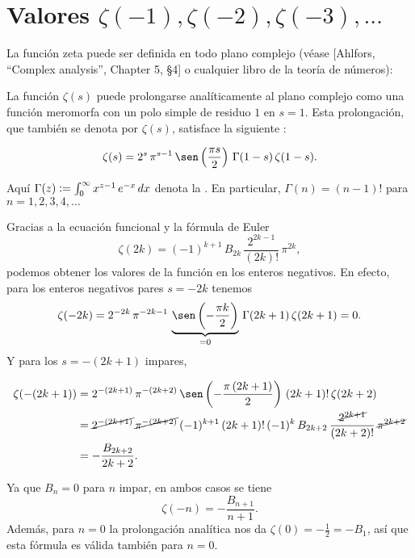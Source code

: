 \documentclass{article}
\begin{document}

\section*{Valores $\zeta (-1), \zeta (-2), \zeta (-3), \ldots$}

La función zeta puede ser definida en todo plano complejo (véase [Ahlfors, ``Complex analysis'', Chapter 5, \S 4] o cualquier libro de la teoría de números):

\begin{hecho*}
La función $\zeta (s)$ puede prolongarse analíticamente al plano complejo como una función meromorfa con un polo simple de residuo $1$ en $s = 1$. Esta prolongación, que también se denota por $\zeta (s)$, satisface la siguiente :

\begin{equation}
\label{ecuacion-funcional}
\zeta (s) = 2^s \, \pi^{s-1} \, \sen \left(\frac{\pi s}{2}\right)\,\Gamma (1-s)\,\zeta (1-s).
\end{equation}
\end{hecho*}

Aquí $\Gamma (z) \mathrel{\mathop:}= \int_0^\infty x^{z-1}\,e^{-x}\,dx$ denota la . En particular, $\Gamma (n) = (n-1)!$ para $n = 1,2,3,4,\ldots$

\vspace{1em}

Gracias a la ecuación funcional y la fórmula de Euler
$$\zeta (2k) = (-1)^{k+1} \, B_{2k}\,\frac{2^{2k-1}}{(2k)!}\,\pi^{2k},$$
podemos obtener los valores de la función en los enteros negativos. En efecto, para los enteros negativos pares $s = -2k$ tenemos
$$\zeta (-2k) = 2^{-2k} \, \pi^{-2k-1} \, \underbrace{\sen \left(-\frac{\pi k}{2}\right)}_{= 0}\,\Gamma (2k+1)\,\zeta (2k+1) = 0.$$
Y para los $s = -(2k+1)$ impares,

\begin{align*}
\zeta (-(2k+1)) & = 2^{-(2k+1)} \, \pi^{-(2k+2)} \, \sen \left(-\frac{\pi\,(2k+1)}{2}\right)\,(2k+1)!\,\zeta (2k+2) \\
 & = \cancel{2^{-(2k+1)}} \, \cancel{\pi^{-(2k+2)}}\,(-1)^{k+1}\,(2k+1)!\,(-1)^k \, B_{2k+2}\,\frac{\cancel{2^{2k+1}}}{(2k+2)!}\,\cancel{\pi^{2k+2}} \\
 & = -\frac{B_{2k+2}}{2k+2}.
\end{align*}

Ya que $B_n = 0$ para $n$ impar, en ambos casos se tiene
$$\zeta (-n) = -\frac{B_{n+1}}{n+1}.$$
Además, para $n = 0$ la prolongación analítica nos da $\zeta (0) = -\frac{1}{2} = -B_1$, así que esta fórmula es válida también para $n = 0$.
\end{document}
